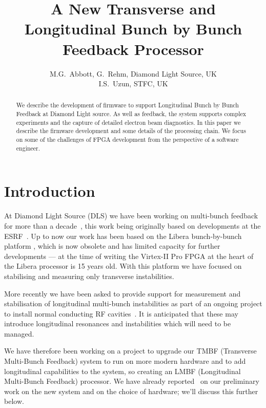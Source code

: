 \documentclass[
    a4paper,
    keeplastbox,            %
    hyphens,                %
]{jacow-2_1}
\begin{document}
\title{A New Transverse and Longitudinal Bunch by Bunch Feedback Processor}
\author{
    M.G.~Abbott, G.~Rehm, Diamond Light Source, UK \\
    I.S.~Uzun, STFC, UK}
\maketitle

\begin{abstract}

We describe the development of firmware to support Longitudinal Bunch by Bunch
Feedback at Diamond Light source.  As well as feedback, the system supports
complex experiments and the capture of detailed electron beam diagnostics.  In
this paper we describe the firmware development and some details of the
processing chain.  We focus on some of the challenges of FPGA development from
the perspective of a software engineer.

\end{abstract}


\section{Introduction}

At Diamond Light Source (DLS) we have been working on multi-bunch feedback for
more than a decade~\cite{dipac2007, epac2008, biw2010, icalepcs2011, ibic2013,
ibic2014, icalepcs2015}, this work being originally based on developments at the
ESRF~\cite{epac2006}.  Up to now our work has been based on the Libera
bunch-by-bunch platform \cite{libera}, which is now obsolete and has limited
capacity for further developments --- at the time of writing the Virtex-II Pro
FPGA at the heart of the Libera processor is 15 years old.  With this platform
we have focused on stabilising and measuring only transverse instabilities.

More recently we have been asked to provide support for measurement and
stabilisation of longitudinal multi-bunch instabilities as part of an ongoing
project to install normal conducting RF cavities~\cite{ipac2017rf}.  It is
anticipated that these may introduce longitudinal resonances and instabilities
which will need to be managed.

We have therefore been working on a project to upgrade our TMBF (Transverse
Multi-Bunch Feedback) system to run on more modern hardware and to add
longitudinal capabilities to the system, so creating an LMBF (Longitudinal
Multi-Bunch Feedback) processor.  We have already reported~\cite{ibic2016} on
our preliminary work on the new system and on the choice of hardware; we'll
discuss this further below.
\end{document}
